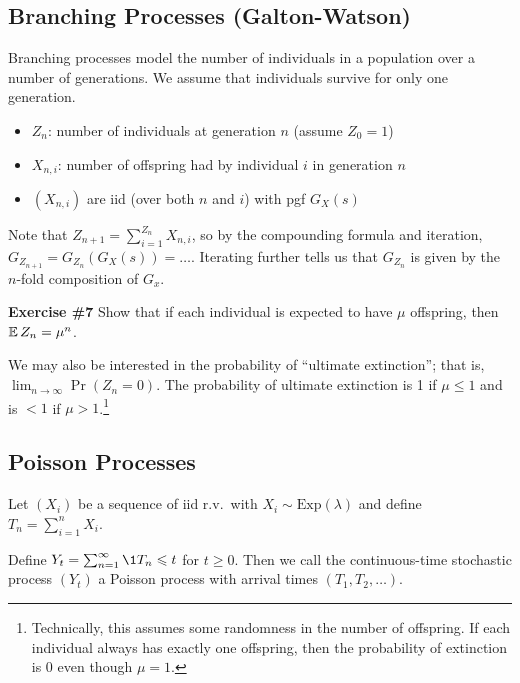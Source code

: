 \subsection{Branching Processes (Galton-Watson)}

Branching processes model the number of individuals in a population over 
a number of generations. We assume that individuals survive for only one generation.
\begin{itemize}
    \item $Z_n$: number of individuals at generation $n$ (assume $Z_0=1$)
    \item $X_{n,i}$: number of offspring had by individual $i$ in generation $n$
    \item $(X_{n,i})$ are iid (over both $n$ and $i$) with pgf $G_X(s)$ 
\end{itemize}

Note that $Z_{n+1} = \sum_{i=1}^{Z_n} X_{n,i}$, so by the compounding formula
and iteration, $G_{Z_{n+1}} = G_{Z_n}(G_X(s)) = \hdots$. Iterating 
further tells us that $G_{Z_n}$ is 
given by the $n$-fold composition of $G_x$.

\begin{tcolorbox}
    \textbf{Exercise \#7}
    Show that if each individual is expected to have $\mu$ offspring, then
    $\operatorname*{\mathbb{E}} Z_n = \mu^n$.
\end{tcolorbox}

We may also be interested in the probability of ``ultimate extinction''; 
that is, $\lim_{n \rightarrow \infty} \Pr(Z_n = 0)$.
The probability of ultimate extinction is 1 if $\mu \leq 1$ and 
is $< 1$ if $\mu > 1$.\footnote{Technically, this assumes some 
randomness in the number of offspring. If 
each individual always has exactly one offspring, then the probability 
of extinction is 0 even though $\mu=1$.}

\subsection{Poisson Processes}

\begin{definition}
    Let $(X_i)$ be a sequence of iid r.v.\ with $X_i \sim \text{Exp}(\lambda)$ and 
    define $T_n = \sum_{i=1}^{n}X_i$.

    Define $Y_t = \sum_{n=1}^{\infty} \1{T_n \leq t}$ for $t \geq 0$.
    Then we call the continuous-time stochastic process $(Y_t)$ a 
    Poisson process with arrival times $(T_1, T_2, \hdots)$.
\end{definition}

